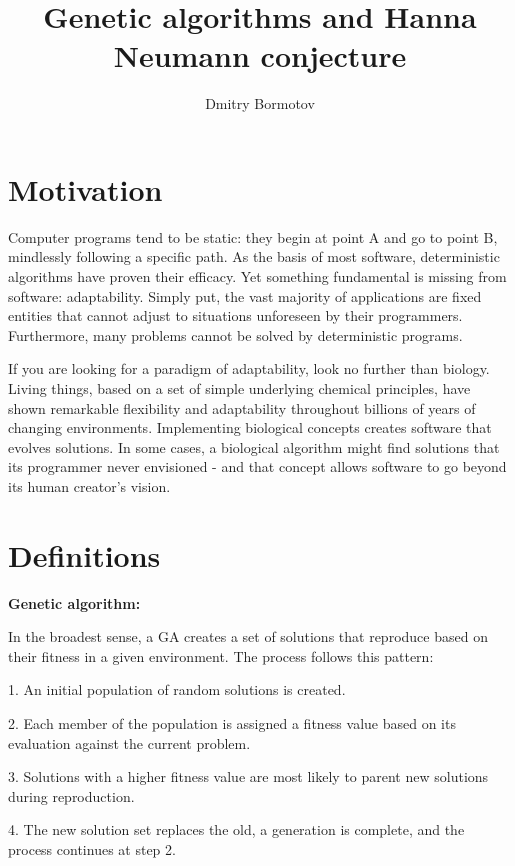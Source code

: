 \documentclass[11pt]{article}
\title{Genetic algorithms and Hanna Neumann conjecture}
\author{Dmitry Bormotov}
\date{}
\begin{document}
\maketitle

\section{Motivation}

\textbf{}

Computer programs tend to be static: they begin at point A and go to
point B, mindlessly following a specific path. As the basis of most
software, deterministic algorithms have proven their efficacy. Yet
something fundamental is missing from software: adaptability. Simply
put, the vast majority of applications are fixed entities that cannot
adjust to situations unforeseen by their programmers. Furthermore,
many problems cannot be solved by deterministic programs.

If you are looking for a paradigm of adaptability, look no further
than biology. Living things, based on a set of simple underlying
chemical principles, have shown remarkable flexibility and
adaptability throughout billions of years of changing environments.
Implementing biological concepts creates software that evolves
solutions. In some cases, a biological algorithm might find solutions
that its programmer never envisioned - and that concept allows
software to go beyond its human creator's vision.


\section{Definitions}

\vspace{5mm}
\noindent
\textbf{Genetic algorithm:}

	In the broadest sense, a GA creates a set of solutions that
reproduce based on their fitness in a given environment. The process
follows this pattern:

1. An initial population of random solutions is created.

2. Each member of the population is assigned a fitness value based on
its evaluation against the current problem.

3. Solutions with a higher fitness value are most likely to parent new
solutions during reproduction.

4. The new solution set replaces the old, a generation is complete,
and the process continues at step 2.
\end{document}
